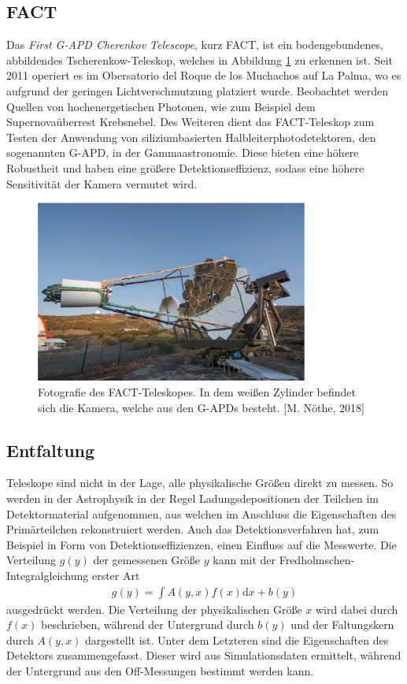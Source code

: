 \subsection{FACT}
Das \textit{First G-APD Cherenkov Telescope}, \cite{Anderhub_2013} kurz FACT, ist ein bodengebundenes, abbildendes Tscherenkow-Teleskop, welches in Abbildung \ref{fig:FACT} zu erkennen ist. Seit 2011 operiert es im Obersatorio del Roque de los Muchachos auf La Palma, wo es aufgrund der geringen Lichtverschmutzung platziert wurde.
Beobachtet werden Quellen von hochenergetischen Photonen, wie zum Beispiel dem Supernovaüberrest Krebsnebel. Des Weiteren dient das FACT-Teleskop zum Testen der Anwendung von siliziumbasierten Halbleiterphotodetektoren, den sogenannten G-APD, in der Gammaastronomie. Diese bieten eine höhere Robustheit und haben eine größere Detektionseffizienz, sodass eine höhere Sensitivität der Kamera vermutet wird. \cite{FACTside, Anderhub_2013} 
\begin{figure}
  \centering
  \includegraphics[width=0.8\textwidth]{graphics/Max.png}
  \caption{ Fotografie des FACT-Teleskopes. In dem weißen Zylinder befindet sich die Kamera, welche aus den G-APDs besteht. [M. Nöthe, 2018]}
  \label{fig:FACT}
\end{figure}


\subsection{Entfaltung}
Teleskope sind nicht in der Lage, alle physikalische Größen direkt zu messen. So werden in der Astrophysik in der Regel Ladungsdepositionen der Teilchen im Detektormaterial aufgenommen, aus welchen im Anschluss die Eigenschaften des Primärteilchen rekonstruiert werden. Auch das Detektionsverfahren hat, zum Beispiel in Form von Detektionseffizienzen,  einen Einfluss auf die Messwerte.
Die Verteilung $g(y)$ der gemessenen Größe $y$ kann mit der Fredholmschen-Integralgleichung erster Art
\begin{align}
	g(y)=\int A(y,x)f(x)\text{d}x + b(y)
	\label{eqn:1}
\end{align}
ausgedrückt werden. Die Verteilung der physikalischen Größe $x$ wird dabei durch $f(x)$ beschrieben, während der Untergrund durch $b(y)$ und der Faltungskern durch $A(y,x)$ dargestellt ist. Unter dem Letzteren sind die Eigenschaften des Detektors zusammengefasst. Dieser wird aus Simulationsdaten ermittelt, während der Untergrund aus den Off-Messungen bestimmt werden kann.

